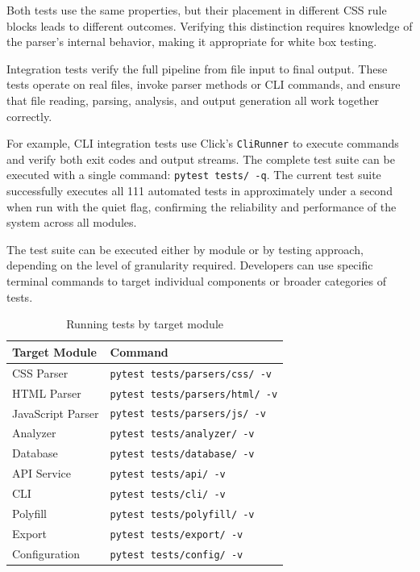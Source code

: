 Both tests use the same properties, but their placement in different CSS rule blocks leads to different outcomes. Verifying this distinction requires knowledge of the parser's internal behavior, making it appropriate for white box testing.

Integration tests verify the full pipeline from file input to final output. These tests operate on real files, invoke parser methods or CLI commands, and ensure that file reading, parsing, analysis, and output generation all work together correctly.

For example, CLI integration tests use Click's \texttt{CliRunner} to execute commands and verify both exit codes and output streams. The complete test suite can be executed with a single command: \texttt{pytest tests/ -q}. The current test suite successfully executes all 111 automated tests in approximately under a second when run with the quiet flag, confirming the reliability and performance of the system across all modules.

The test suite can be executed either by module or by testing approach, depending on the level of granularity required. Developers can use specific terminal commands to target individual components or broader categories of tests.

\begin{table}[H]
    \centering
    \begin{tabular}{|l|l|}
        \hline
        \textbf{Target Module} & \textbf{Command} \\
        \hline \hline
        CSS Parser & \texttt{pytest tests/parsers/css/ -v} \\ \hline
        HTML Parser & \texttt{pytest tests/parsers/html/ -v} \\ \hline
        JavaScript Parser & \texttt{pytest tests/parsers/js/ -v} \\ \hline
        Analyzer & \texttt{pytest tests/analyzer/ -v} \\ \hline
        Database & \texttt{pytest tests/database/ -v} \\ \hline
        API Service & \texttt{pytest tests/api/ -v} \\ \hline
        CLI & \texttt{pytest tests/cli/ -v} \\ \hline
        Polyfill & \texttt{pytest tests/polyfill/ -v} \\ \hline
        Export & \texttt{pytest tests/export/ -v} \\ \hline
        Configuration & \texttt{pytest tests/config/ -v} \\ \hline
    \end{tabular}
    \caption{Running tests by target module}
    \label{tab:test-by-module}
\end{table}


